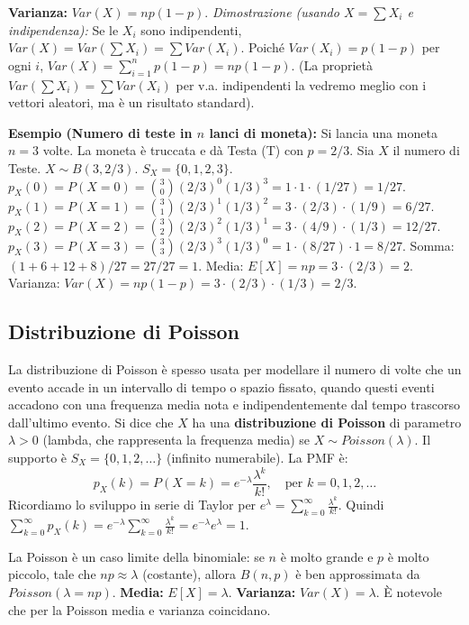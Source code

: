 \textbf{Varianza:} $Var(X) = np(1-p)$.
\textit{Dimostrazione (usando $X=\sum X_i$ e indipendenza):} Se le $X_i$ sono indipendenti, $Var(X) = Var(\sum X_i) = \sum Var(X_i)$.
Poiché $Var(X_i)=p(1-p)$ per ogni $i$, $Var(X) = \sum_{i=1}^n p(1-p) = np(1-p)$.
(La proprietà $Var(\sum X_i) = \sum Var(X_i)$ per v.a. indipendenti la vedremo meglio con i vettori aleatori, ma è un risultato standard).

\begin{example}
\textbf{Esempio (Numero di teste in $n$ lanci di moneta):}
Si lancia una moneta $n=3$ volte. La moneta è truccata e dà Testa (T) con $p=2/3$. Sia $X$ il numero di Teste.
$X \sim B(3, 2/3)$.
$S_X = \{0,1,2,3\}$.
$p_X(0) = P(X=0) = \binom{3}{0} (2/3)^0 (1/3)^3 = 1 \cdot 1 \cdot (1/27) = 1/27$.
$p_X(1) = P(X=1) = \binom{3}{1} (2/3)^1 (1/3)^2 = 3 \cdot (2/3) \cdot (1/9) = 6/27$.
$p_X(2) = P(X=2) = \binom{3}{2} (2/3)^2 (1/3)^1 = 3 \cdot (4/9) \cdot (1/3) = 12/27$.
$p_X(3) = P(X=3) = \binom{3}{3} (2/3)^3 (1/3)^0 = 1 \cdot (8/27) \cdot 1 = 8/27$.
Somma: $(1+6+12+8)/27 = 27/27 = 1$.
Media: $E[X] = np = 3 \cdot (2/3) = 2$.
Varianza: $Var(X) = np(1-p) = 3 \cdot (2/3) \cdot (1/3) = 2/3$.
\end{example}

\subsection{Distribuzione di Poisson}
La distribuzione di Poisson è spesso usata per modellare il numero di volte che un evento accade in un intervallo di tempo o spazio fissato, quando questi eventi accadono con una frequenza media nota e indipendentemente dal tempo trascorso dall'ultimo evento.
Si dice che $X$ ha una \textbf{distribuzione di Poisson} di parametro $\lambda > 0$ (lambda, che rappresenta la frequenza media) se $X \sim Poisson(\lambda)$.
Il supporto è $S_X = \{0, 1, 2, \dots\}$ (infinito numerabile).
La PMF è:
\[ p_X(k) = P(X=k) = e^{-\lambda} \frac{\lambda^k}{k!}, \quad \text{per } k=0, 1, 2, \dots \]
Ricordiamo lo sviluppo in serie di Taylor per $e^\lambda = \sum_{k=0}^\infty \frac{\lambda^k}{k!}$.
Quindi $\sum_{k=0}^\infty p_X(k) = e^{-\lambda} \sum_{k=0}^\infty \frac{\lambda^k}{k!} = e^{-\lambda} e^\lambda = 1$.

La Poisson è un caso limite della binomiale: se $n$ è molto grande e $p$ è molto piccolo, tale che $np \approx \lambda$ (costante), allora $B(n,p)$ è ben approssimata da $Poisson(\lambda=np)$.
\textbf{Media:} $E[X] = \lambda$.
\textbf{Varianza:} $Var(X) = \lambda$.
È notevole che per la Poisson media e varianza coincidano.

